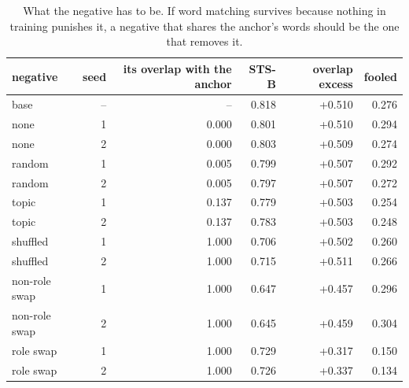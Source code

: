 \begin{table}[t]
\centering
\small
\caption{What the negative has to be. If word matching survives because nothing in training punishes it, a negative that shares the anchor's words should be the one that removes it.}
\begin{tabular}{lrrrrr}
\toprule
negative & seed & its overlap with the anchor & STS-B & overlap excess & fooled \\
\midrule
base & -- & -- & 0.818 & +0.510 & 0.276 \\
none & 1 & 0.000 & 0.801 & +0.510 & 0.294 \\
none & 2 & 0.000 & 0.803 & +0.509 & 0.274 \\
random & 1 & 0.005 & 0.799 & +0.507 & 0.292 \\
random & 2 & 0.005 & 0.797 & +0.507 & 0.272 \\
topic & 1 & 0.137 & 0.779 & +0.503 & 0.254 \\
topic & 2 & 0.137 & 0.783 & +0.503 & 0.248 \\
shuffled & 1 & 1.000 & 0.706 & +0.502 & 0.260 \\
shuffled & 2 & 1.000 & 0.715 & +0.511 & 0.266 \\
non-role swap & 1 & 1.000 & 0.647 & +0.457 & 0.296 \\
non-role swap & 2 & 1.000 & 0.645 & +0.459 & 0.304 \\
role swap & 1 & 1.000 & 0.729 & +0.317 & 0.150 \\
role swap & 2 & 1.000 & 0.726 & +0.337 & 0.134 \\
\bottomrule
\end{tabular}
\end{table}
